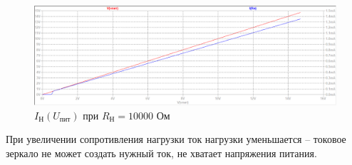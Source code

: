 \documentclass[a4paper, 12pt]{article}
\begin{document}
    \begin{figure}[H]
        \centering
        \includegraphics[scale=0.46]{1task_Iн(Vпит)_Rн10000.png}
        \captionsetup{skip=0pt}
        \caption{$I_\text{Н}\left( U_\text{пит} \right)$ при $R_\text{Н}=10000$ Ом}
        \label{fig:1task_InVlR10000}
    \end{figure}
    \noindent При увеличении сопротивления нагрузки ток нагрузки уменьшается -- токовое зеркало не может создать нужный ток,
    не хватает напряжения питания.
\end{document}
